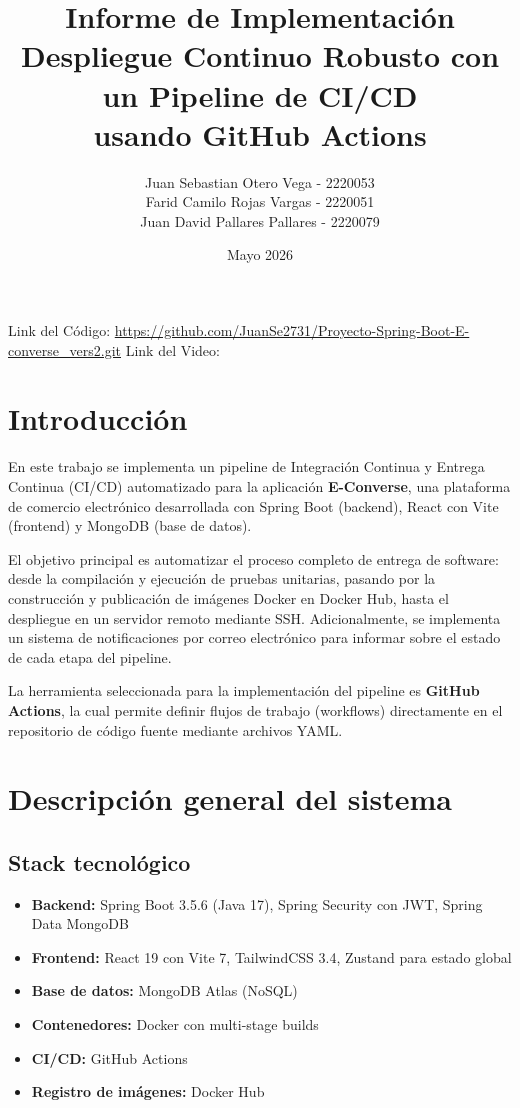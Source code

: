\documentclass[12pt,a4paper]{article}
\title{Informe de Implementación\\Despliegue Continuo Robusto con un Pipeline de CI/CD\\usando GitHub Actions}
\author{Juan Sebastian Otero Vega - 2220053 \\ Farid Camilo Rojas Vargas - 2220051\\ Juan David Pallares Pallares - 2220079}
\date{Mayo 2026}
\begin{document}
\maketitle

\begin{center}
    Link del Código: \url{https://github.com/JuanSe2731/Proyecto-Spring-Boot-E-converse_vers2.git}
    Link del Video: \url{}
\end{center}

\newpage
{\small
\tableofcontents
}
\newpage

\section{Introducción}
En este trabajo se implementa un pipeline de Integración Continua y Entrega Continua (CI/CD) automatizado para la aplicación \textbf{E-Converse}, una plataforma de comercio electrónico desarrollada con Spring Boot (backend), React con Vite (frontend) y MongoDB (base de datos).

El objetivo principal es automatizar el proceso completo de entrega de software: desde la compilación y ejecución de pruebas unitarias, pasando por la construcción y publicación de imágenes Docker en Docker Hub, hasta el despliegue en un servidor remoto mediante SSH. Adicionalmente, se implementa un sistema de notificaciones por correo electrónico para informar sobre el estado de cada etapa del pipeline.

La herramienta seleccionada para la implementación del pipeline es \textbf{GitHub Actions}, la cual permite definir flujos de trabajo (workflows) directamente en el repositorio de código fuente mediante archivos YAML.

\section{Descripción general del sistema}

\subsection{Stack tecnológico}
\begin{itemize}
    \item \textbf{Backend:} Spring Boot 3.5.6 (Java 17), Spring Security con JWT, Spring Data MongoDB
    \item \textbf{Frontend:} React 19 con Vite 7, TailwindCSS 3.4, Zustand para estado global
    \item \textbf{Base de datos:} MongoDB Atlas (NoSQL)
    \item \textbf{Contenedores:} Docker con multi-stage builds
    \item \textbf{CI/CD:} GitHub Actions
    \item \textbf{Registro de imágenes:} Docker Hub
\end{itemize}
\end{document}
